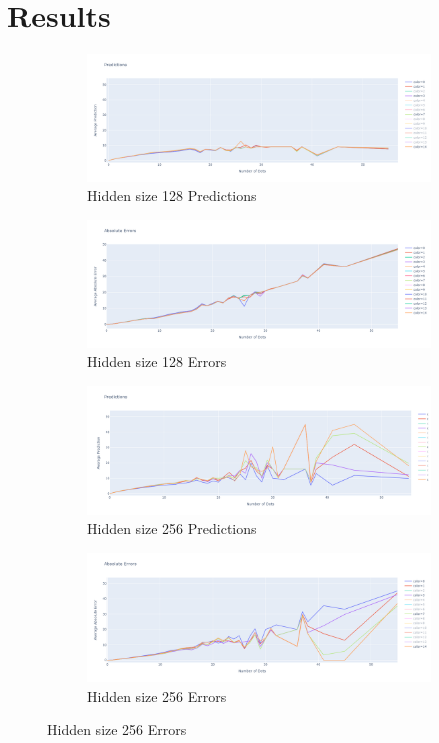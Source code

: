 \documentclass{article}
\begin{document}
\section{Results}
\begin{figure}[H]
  \begin{subfigure}{0.6\textwidth}
  \centering
    \includegraphics[width=.8\linewidth]{template/fourthx_0to55_prediction_samescale.png}
    \caption{Hidden size 128 Predictions}
    \label{fig:1}
  \end{subfigure}%
  \begin{subfigure}{0.6\textwidth}
    \centering
    \includegraphics[width=.8\linewidth]{template/fourthx_0to55_error_samescale.png}
    \caption{Hidden size 128 Errors}
    \label{fig:4}
  \end{subfigure}
  
  \medskip
  \begin{subfigure}{0.6\textwidth}
    \centering
    \includegraphics[width=.8\linewidth]{template/1x_0to55_prediction_samescale.png}
    \caption{Hidden size 256 Predictions}
    \label{fig:2}
  \end{subfigure}
    \begin{subfigure}{0.6\textwidth}
    \centering
    \includegraphics[width=.8\linewidth]{template/1x_0to55_error_samescale.png}
    \caption{Hidden size 256 Errors}
    \label{fig:5}
  \end{subfigure}
  

\end{figure}
\end{document}
